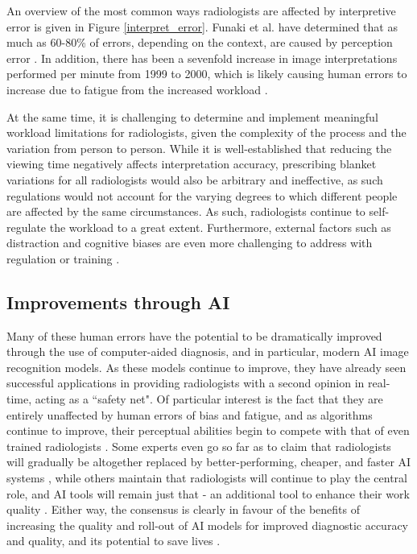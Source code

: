 An overview of the most common ways radiologists are affected by interpretive error is given in Figure \ref{interpret_error}. Funaki et al. have determined that as much as 60-80\% of errors, depending on the context, are caused by perception error \cite{perception_error}. In addition, there has been a sevenfold increase in image interpretations performed per minute from 1999 to 2000, which is likely causing human errors to increase due to fatigue from the increased workload \cite{radiology_error}. 

At the same time, it is challenging to determine and implement meaningful workload limitations for radiologists, given the complexity of the process and the variation from person to person. While it is well-established that reducing the viewing time negatively affects interpretation accuracy, prescribing blanket variations for all radiologists would also be arbitrary and ineffective, as such regulations would not account for the varying degrees to which different people are affected by the same circumstances. As such, radiologists continue to self-regulate the workload to a great extent. Furthermore, external factors such as distraction and cognitive biases are even more challenging to address with regulation or training \cite{workload}. 

\subsection{Improvements through AI}
Many of these human errors have the potential to be dramatically improved through the use of computer-aided diagnosis, and in particular, modern AI image recognition models. As these models continue to improve, they have already seen successful applications in providing radiologists with a second opinion in real-time, acting as a ``safety net". Of particular interest is the fact that they are entirely unaffected by human errors of bias and fatigue, and as algorithms continue to improve, their perceptual abilities begin to compete with that of even trained radiologists \cite{workload}. Some experts even go so far as to claim that radiologists will gradually be altogether replaced by better-performing, cheaper, and faster AI systems \cite{ai_foe}, while others maintain that radiologists will continue to play the central role, and AI tools will remain just that - an additional tool to enhance their work quality \cite{doctors_ftw}. Either way, the consensus is clearly in favour of the benefits of increasing the quality and roll-out of AI models for improved diagnostic accuracy and quality, and its potential to save lives \cite{consensus}\cite{ai_adoption}. 


